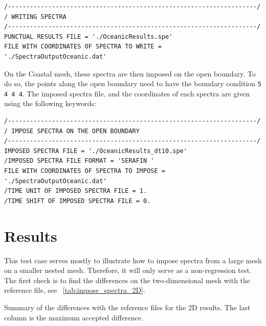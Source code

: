 \lstset{language=TelemacCas,
        basicstyle=\scriptsize\ttfamily}

\begin{lstlisting}[frame=trBL]
/--------------------------------------------------------------------/
/ WRITING SPECTRA
/--------------------------------------------------------------------/
PUNCTUAL RESULTS FILE = './OceanicResults.spe'
FILE WITH COORDINATES OF SPECTRA TO WRITE =
'./SpectraOutputOceanic.dat'
\end{lstlisting}

On the Coastal mesh, these spectra are then imposed on the open boundary. To do so, the points along
the open boundary need to have the boundary condition \verb+5 4 4 4+. The imposed spectra file, and
the coordinates of each spectra are given using the following keywords:

\lstset{language=TelemacCas,
        basicstyle=\scriptsize\ttfamily}

\begin{lstlisting}[frame=trBL]
/--------------------------------------------------------------------/
/ IMPOSE SPECTRA ON THE OPEN BOUNDARY
/--------------------------------------------------------------------/
IMPOSED SPECTRA FILE = './OceanicResults_dt10.spe'
/IMPOSED SPECTRA FILE FORMAT = 'SERAFIN '
FILE WITH COORDINATES OF SPECTRA TO IMPOSE =
'./SpectraOutputOceanic.dat'
/TIME UNIT OF IMPOSED SPECTRA FILE = 1.
/TIME SHIFT OF IMPOSED SPECTRA FILE = 0.
\end{lstlisting}

%
%
%
\section{Results}

This test case serves mostly to illustrate how to impose spectra from a large mesh on a smaller nested
mesh. Therefore, it will only serve as a non-regression test. The first check is to find the differences
on the two-dimensional mesh with the reference file, see \tablename~\ref{tab:impose_spectra_2D}.

%
\begin{table}[H]
\begin{center}
%
\footnotesize
%
\caption{Summary of the differences with the reference files for the 2D results. The last column is
the maximum accepted difference.}
\label{tab:impose_spectra_2D}
%
%
%
\end{center}
\end{table}
%

